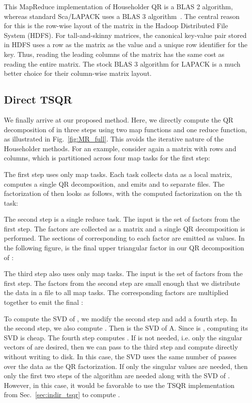 \documentclass[10pt, conference, compsocconf]{IEEEtran}
\begin{document}
This MapReduce implementation of Householder QR is a BLAS 2 algorithm, whereas standard Sca/LAPACK uses a BLAS 3 algorithm~\cite{lapack-guide-1999,choi-1995-scalapack}.  The central reason for this is the row-wise layout of the matrix in the Hadoop Distributed File System (HDFS).  For tall-and-skinny matrices, the canonical key-value pair stored in HDFS uses a row as the matrix as the value and a unique row identifier for the key.  Thus, reading the leading columns of the matrix has the same cost as reading the entire matrix.  The stock BLAS 3 algorithm for LAPACK is a much better choice for their column-wise matrix layout.

\subsection{Direct TSQR}\label{sec:direct_tsqr}

We finally arrive at our proposed method.  Here, we directly compute the QR decomposition of  in three steps using two map functions and one reduce function, as illustrated in Fig.~\ref{fig:MR_full}.  This avoids the iterative nature of the Householder methods.  For an example, consider again a matrix  with  rows and  columns, which is partitioned across four map tasks for the first step:

The first step uses only map tasks.  Each task collects data as a local matrix, computes a single QR decomposition, and emits  and  to separate files.  The factorization of  then looks as follows, with  the computed factorization on the th task:

The second step is a single reduce task.  The input is the set of  factors from the first step.  The  factors are collected as a matrix and a single QR decomposition is performed.  The sections of  corresponding to each  factor are emitted as values.  In the following figure,  is the final upper triangular factor in our QR decomposition of :

The third step also uses only map tasks.  The input is the set of  factors from the first step.  The  factors from the second step are small enough that we distribute the data in a file to all map tasks.  The corresponding  factors are multiplied together to emit the final :



To compute the SVD of , we modify the second step and add a fourth step.  In the second step, we also compute .  Then  is the SVD of A.  Since  is , computing its SVD is cheap.  The fourth step computes .  If  is not needed, i.e. only the singular vectors of  are desired, then we can pass  to the third step and compute  directly without writing  to disk.  In this case, the SVD uses the same number of passes over the data as the QR factorization.  If only the singular values are needed, then only the first two steps of the algorithm are needed along with the SVD of .  However, in this case, it would be favorable to use the TSQR implementation from Sec.~\ref{sec:indir_tsqr} to compute .
\end{document}
